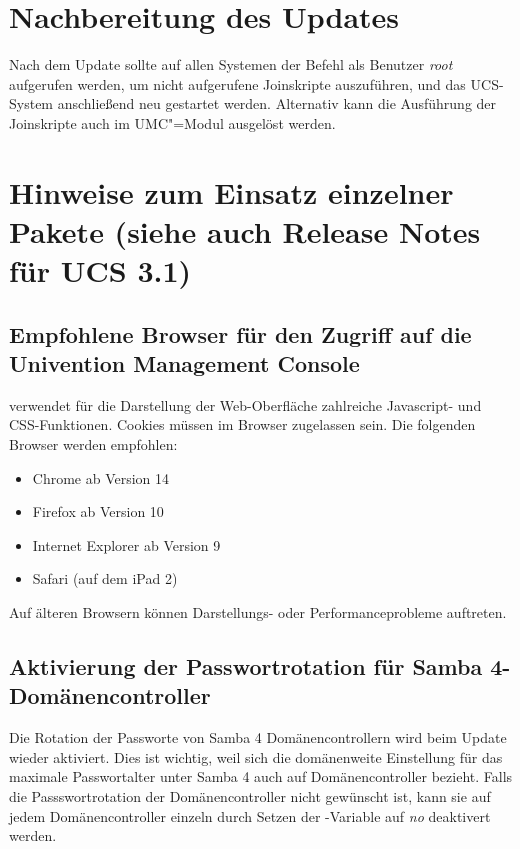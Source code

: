\chapter{Nachbereitung des Updates}

Nach dem Update sollte auf allen Systemen der
Befehl  als
Benutzer \emph{root} aufgerufen werden, um nicht aufgerufene Joinskripte auszuführen, und
das UCS-System anschließend neu gestartet werden. Alternativ kann die Ausführung 
der Joinskripte auch im UMC"=Modul  ausgelöst werden.




\chapter{Hinweise zum Einsatz einzelner Pakete (siehe auch Release Notes für UCS 3.1)}

\section{Empfohlene Browser für den Zugriff auf die Univention Management Console}

\ucsUMC{} verwendet für die Darstellung der Web-Oberfläche zahlreiche
Javascript- und CSS-Funktionen. Cookies müssen im Browser zugelassen
sein. Die folgenden Browser werden empfohlen:

\begin{itemize}
\item Chrome ab Version 14
\item Firefox ab Version 10
\item Internet Explorer ab Version 9
\item Safari (auf dem iPad 2)
\end{itemize}

Auf älteren Browsern können Darstellungs- oder Performanceprobleme
auftreten.

\section{Aktivierung der Passwortrotation für Samba 4-Domänencontroller}

Die Rotation der Passworte von Samba 4 Domänencontrollern wird beim Update wieder aktiviert.
Dies ist wichtig, weil sich die domänenweite Einstellung für das maximale Passwortalter
unter Samba 4 auch auf Domänencontroller bezieht. Falls die Passswortrotation der
Domänencontroller nicht gewünscht ist, kann sie auf jedem Domänencontroller einzeln
durch Setzen der \ucsUCR{}-Variable  auf \emph{no} deaktivert werden.

